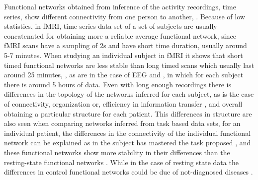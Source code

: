\documentclass[a4paper,12pt]{article}
\begin{document}
Functional networks obtained from inference of the activity recordings, time series, show different connectivity from one person to another, \cite{Gordon2017}.
Because of low statistics, in fMRI, time series data set of a set of subjects are usually concatenated for obtaining more a reliable average functional network, since fMRI scans have a sampling of 2s and have short time duration, usually around 5-7 minutes. When studying an individual subject in fMRI it shows that short timed functional networks are less stable than long timed scans which usually last around 25 minutes, \cite{Anderson2011}, as are in the case of EEG and \cite{Gordon2017}, in which for each subject there is around 5 hours of data. 
Even with long enough recordings there is differences in the topology of the networks inferred for each subject, as is the case of connectivity, organization or, efficiency in information transfer \cite{Gordon2017}, and overall obtaining a particular structure for each patient.
This differences in structure are also seen when comparing networks inferred from task based data sets, for an individual patient, the differences in the connectivity of the individual functional network can be explained as in the subject has mastered the task proposed \cite{Amoruso2017}, and these functional networks show more stability in their differences than the resting-state functional networks \cite{Anderson2011}. While in the case of resting state data the differences in control functional networks could be due of not-diagnosed diseases \cite{Gordon2017}. %

\end{document}
